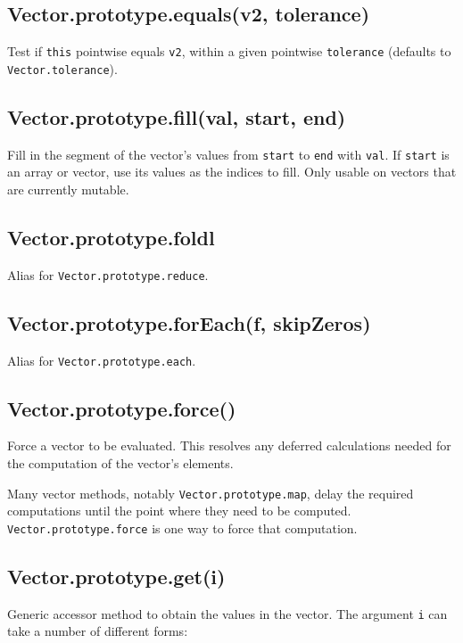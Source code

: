 \documentclass{article}
\begin{document}
    \subsection*{Vector.prototype.equals(v2, tolerance)}
    Test if \texttt{this} pointwise equals \texttt{v2}, within a given pointwise \texttt{tolerance}
(defaults to \texttt{Vector.tolerance}).


    \subsection*{Vector.prototype.fill(val, start, end)}
    Fill in the segment of the vector's values from \texttt{start} to \texttt{end} with \texttt{val}.
If \texttt{start} is an array or vector, use its values as the indices to fill. Only usable
on vectors that are currently mutable.


    \subsection*{Vector.prototype.foldl}
    Alias for \texttt{Vector.prototype.reduce}.


    \subsection*{Vector.prototype.forEach(f, skipZeros)}
    Alias for \texttt{Vector.prototype.each}.


    \subsection*{Vector.prototype.force()}
    Force a vector to be evaluated. This resolves any deferred calculations
needed for the computation of the vector's elements.


Many vector methods, notably \texttt{Vector.prototype.map}, delay the required computations
until the point where they need to be computed. \texttt{Vector.prototype.force} is one
way to force that computation.


    \subsection*{Vector.prototype.get(i)}
    Generic accessor method to obtain the values in the vector. The argument \texttt{i} can take a
number of different forms:
\end{document}
